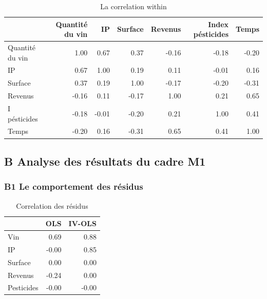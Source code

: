 \documentclass[11pt,]{article}
\begin{document}
\begin{table}[ht]
\centering
\begin{tabular}{l|rrrrrr}
  \hline
 & Quantité du vin & IP & Surface & Revenus & Index pésticides & Temps \\ 
  \hline
Quantité du vin & 1.00 & 0.67 & 0.37 & -0.16 & -0.18 & -0.20 \\ 
  IP & 0.67 & 1.00 & 0.19 & 0.11 & -0.01 & 0.16 \\ 
  Surface & 0.37 & 0.19 & 1.00 & -0.17 & -0.20 & -0.31 \\ 
  Revenus & -0.16 & 0.11 & -0.17 & 1.00 & 0.21 & 0.65 \\ 
  I pésticides & -0.18 & -0.01 & -0.20 & 0.21 & 1.00 & 0.41 \\ 
  Temps & -0.20 & 0.16 & -0.31 & 0.65 & 0.41 & 1.00 \\ 
   \hline
\end{tabular}
\caption{La correlation within} 
\end{table}

\FloatBarrier

\newpage

\hypertarget{b-analyse-des-resultats-du-cadre-m1}{%
\subsection{B Analyse des résultats du cadre
M1}\label{b-analyse-des-resultats-du-cadre-m1}}

\hypertarget{b1-le-comportement-des-residus}{%
\subsubsection{B1 Le comportement des
résidus}\label{b1-le-comportement-des-residus}}

\FloatBarrier

\begin{table}[ht]
\centering
\begin{tabular}{l|rr}
  \hline
 & OLS & IV-OLS \\ 
  \hline
Vin & 0.69 & 0.88 \\ 
  IP & -0.00 & 0.85 \\ 
  Surface & 0.00 & 0.00 \\ 
  Revenus & -0.24 & 0.00 \\ 
  Pesticides & -0.00 & -0.00 \\ 
   \hline
\end{tabular}
\caption{Correlation des résidus} 
\end{table}
\end{document}
